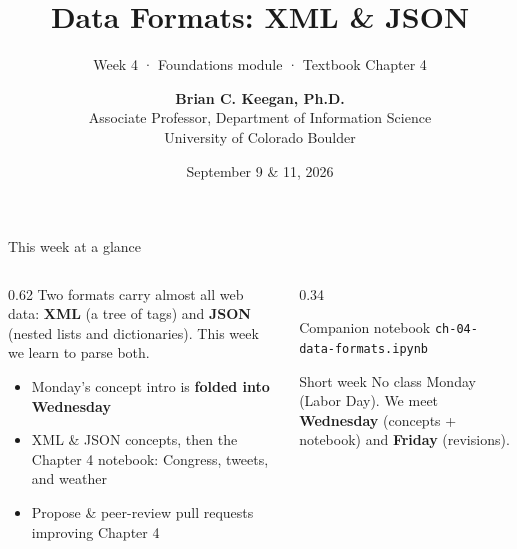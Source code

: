 \documentclass[9pt,aspectratio=169]{beamer}
\title[Week 4 · Data Formats]{{\Huge Data Formats: XML \& JSON}}
\subtitle{Week 4 · Foundations module · Textbook Chapter 4}
\author[Keegan]{\textbf{Brian C. Keegan, Ph.D.} \\ Associate Professor, Department of Information Science \\ University of Colorado Boulder}
\date{September 9 \& 11, 2026}
\begin{document}
\maketitle

\begin{frame}{This week at a glance}
    \begin{columns}[T]
        \begin{column}{0.62\textwidth}
            Two formats carry almost all web data: \textbf{XML} (a tree of tags) and \textbf{JSON} (nested lists and dictionaries). This week we learn to parse both.

            \vspace{0.75em}

            \begin{itemize}\small
                \item Monday's concept intro is \textbf{folded into Wednesday}
            \end{itemize}

            \vspace{0.5em}

            \begin{itemize}\small
                \item XML \& JSON concepts, then the Chapter 4 notebook: Congress, tweets, and weather
            \end{itemize}

            \vspace{0.5em}

            \begin{itemize}\small
                \item Propose \& peer-review pull requests improving Chapter 4
            \end{itemize}
        \end{column}
        \begin{column}{0.34\textwidth}
            \begin{block}{Companion notebook}
                \footnotesize \texttt{ch-04-data-formats.ipynb}
            \end{block}
            \begin{alertblock}{Short week}
                \footnotesize No class Monday (Labor Day). We meet \textbf{Wednesday} (concepts + notebook) and \textbf{Friday} (revisions).
            \end{alertblock}
        \end{column}
    \end{columns}
\end{frame}
\end{document}
